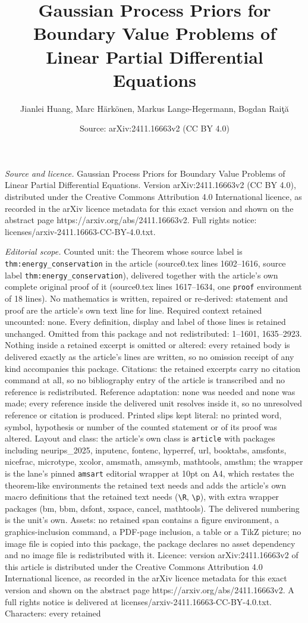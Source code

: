 \documentclass[10pt,a4paper]{amsart}
\title[Gaussian Process Priors for Boundary Value Problems of Linea]{Gaussian Process Priors for Boundary Value Problems of Linear Partial Differential Equations}
\author{Jianlei Huang, Marc H\"ark\"onen, Markus Lange-Hegermann, Bogdan Rai\c{t}\u{a}}
\date{Source: arXiv:2411.16663v2 (CC BY 4.0)}
\begin{document}
\maketitle

\noindent\emph{Source and licence.} Gaussian Process Priors for Boundary Value Problems of Linear Partial Differential Equations. Version arXiv:2411.16663v2 (CC BY 4.0), distributed under the Creative Commons Attribution 4.0 International licence, as recorded in the arXiv licence metadata for this exact version and shown on the abstract page https://arxiv.org/abs/2411.16663v2. Full rights notice: licenses/arxiv-2411.16663-CC-BY-4.0.txt.\par\smallskip

\noindent\textit{Editorial scope.} Counted unit: the Theorem whose source label is \texttt{thm:energy\_conservation} in the article (source0.tex lines 1602--1616, source label \texttt{thm:energy\_conservation}), delivered together with the article's own complete original proof of it (source0.tex lines 1617--1634, one \texttt{proof} environment of 18 lines). No mathematics is written, repaired or re-derived: statement and proof are the article's own text line for line. Required context retained uncounted: none. Every definition, display and label of those lines is retained unchanged. Omitted from this package and not redistributed: 1--1601, 1635--2923. Nothing inside a retained excerpt is omitted or altered: every retained body is delivered exactly as the article's lines are written, so no omission receipt of any kind accompanies this package. Citations: the retained excerpts carry no citation command at all, so no bibliography entry of the article is transcribed and no reference is redistributed. Reference adaptation: none was needed and none was made; every reference inside the delivered unit resolves inside it, so no unresolved reference or citation is produced. Printed slips kept literal: no printed word, symbol, hypothesis or number of the counted statement or of its proof was altered. Layout and class: the article's own class is \texttt{article} with packages including neurips\_2025, inputenc, fontenc, hyperref, url, booktabs, amsfonts, nicefrac, microtype, xcolor, amsmath, amssymb, mathtools, amsthm; the wrapper is the lane's pinned \texttt{amsart} editorial wrapper at 10pt on A4, which restates the theorem-like environments the retained text needs and adds the article's own macro definitions that the retained text needs (\texttt{\textbackslash R}, \texttt{\textbackslash p}), with extra wrapper packages (bm, bbm, dsfont, xspace, cancel, mathtools). The delivered numbering is the unit's own. Assets: no retained span contains a figure environment, a graphics-inclusion command, a PDF-page inclusion, a table or a TikZ picture; no image file is copied into this package, the package declares no asset dependency and no image file is redistributed with it. Licence: version arXiv:2411.16663v2 of this article is distributed under the Creative Commons Attribution 4.0 International licence, as recorded in the arXiv licence metadata for this exact version and shown on the abstract page https://arxiv.org/abs/2411.16663v2. A full rights notice is delivered at licenses/arxiv-2411.16663-CC-BY-4.0.txt. Characters: every retained 
\end{document}
